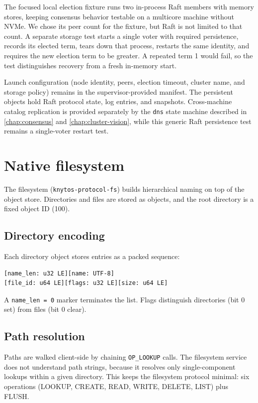 The focused local election fixture runs two in-process Raft members with memory
stores, keeping consensus behavior testable on a multicore machine without
NVMe. We chose its peer count for the fixture, but Raft is not limited to that count.
A separate storage test starts a single voter with required persistence,
records its elected term, tears down that process, restarts the same identity,
and requires the new election term to be greater. A repeated term 1 would
fail, so the test distinguishes recovery from a fresh in-memory start.

Launch configuration (node identity, peers, election timeout, cluster name,
and storage policy) remains in the supervisor-provided manifest. The
persistent objects hold Raft protocol state, log entries, and snapshots.
Cross-machine catalog replication is provided separately by the \texttt{dns}
state machine described in \autoref{chap:consensus} and
\autoref{chap:cluster-vision}, while this generic Raft persistence test
remains a single-voter restart test.

\section{Native filesystem}

The filesystem (\texttt{knytos-protocol-fs}) builds hierarchical naming on
top of the object store. Directories and files are stored as objects, and the root
directory is a fixed object ID (100).

\subsection{Directory encoding}

Each directory object stores entries as a packed sequence:

\begin{verbatim}
[name_len: u32 LE][name: UTF-8]
[file_id: u64 LE][flags: u32 LE][size: u64 LE]
\end{verbatim}

A \texttt{name\_len = 0} marker terminates the list. Flags distinguish
directories (bit 0 set) from files (bit 0 clear).

\subsection{Path resolution}

Paths are walked client-side by chaining \texttt{OP\_LOOKUP} calls. The
filesystem service does not understand path strings, because it resolves only
single-component lookups within a given directory. This keeps the filesystem
protocol minimal: six operations (LOOKUP, CREATE, READ, WRITE, DELETE, LIST)
plus FLUSH.

